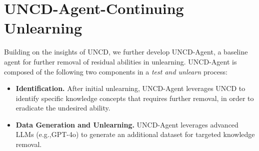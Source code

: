 








\section{UNCD-Agent-Continuing Unlearning}

Building on the insights of UNCD, we further develop UNCD-Agent,  a baseline agent for further removal of residual abilities in unlearning. UNCD-Agent is composed of the following two components in a \emph{test and unlearn} process: 
\vspace{-6pt}
\begin{itemize}[leftmargin=*,itemsep=0pt,parsep=0pt]
\item \textbf{Identification.} After initial unlearning, UNCD-Agent leverages UNCD  to identify specific knowledge concepts that requires further removal, in order to eradicate the undesired ability.
\item \textbf{Data Generation and Unlearning.} UNCD-Agent leverages advanced LLMs (e.g.,GPT-4o) to generate an additional dataset for targeted knowledge removal.

\end{itemize}
\vspace{-6pt}



